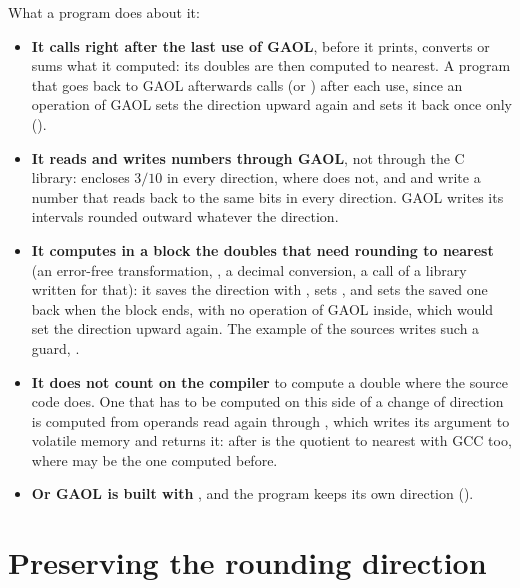 \documentclass[12pt,a4paper,twoside,openright]{book}
\begin{document}
\medskip
\noindent
What a program does about it:
\begin{itemize}
\item[$\bullet$] \textbf{It calls  right after the last use of
  GAOL}, before it prints, converts or sums what it computed: its doubles are
  then computed to nearest. A program that goes back to GAOL afterwards calls
   (or ) after
  each use, since an operation of GAOL sets the direction upward again and
   sets it back once only ().
\item[$\bullet$] \textbf{It reads and writes numbers through GAOL}, not
  through the C library:  encloses $3/10$ in
  every direction, where  does not, and
   and  write a number that reads back to the
  same bits in every direction. GAOL writes its intervals rounded outward
  whatever the direction.
\item[$\bullet$] \textbf{It computes in a block the doubles that need rounding
  to nearest} (an error-free transformation, , a decimal
  conversion, a call of a library written for that): it saves the direction
  with , sets , and sets the saved
  one back when the block ends, with no operation of GAOL inside, which would
  set the direction upward again. The example of the sources writes such a
  guard, .
\item[$\bullet$] \textbf{It does not count on the compiler} to compute a
  double where the source code does. One that has to be computed on this side
  of a change of direction is computed from operands read again through
  , which writes its argument to volatile memory
  and returns it: 
  after  is the quotient to nearest with GCC too, where
   may be the one computed before.
\item[$\bullet$] \textbf{Or GAOL is built with
  }, and the program keeps its own direction
  ().
\end{itemize}

\section{Preserving the rounding direction}\label{sec:preserve-rounding}
%
%
\end{document}
